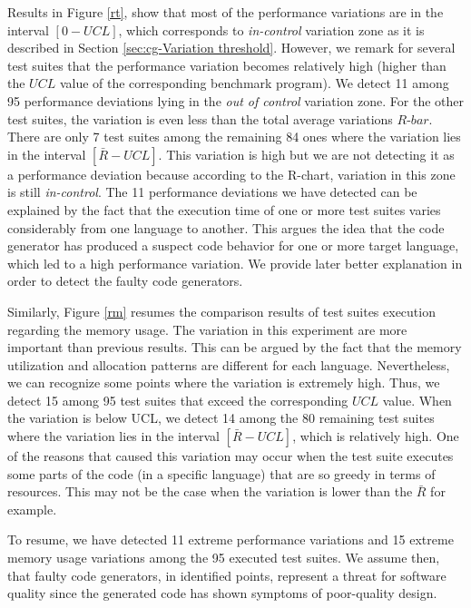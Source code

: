 Results in Figure \ref{rt}, show that most of the performance variations are in the interval $[0-UCL]$, which corresponds to \textit{in-control} variation zone as it is described in Section \ref{sec:cg-Variation threshold}. However, we remark for several test suites that the performance variation becomes relatively high (higher than the $UCL$ value of the corresponding benchmark program). We detect 11 among 95 performance deviations lying in the \textit{out of control} variation zone. For the other test suites, the variation is even less than the total average variations $R$-$bar$. There are only 7 test suites among the remaining 84 ones where the variation lies in the interval $[\bar{R}-UCL]$. This variation is high but we are not detecting it as a performance deviation because according to the R-chart, variation in this zone is still \textit{in-control}. 
The 11 performance deviations we have detected can be explained by the fact that the execution time of one or more test suites varies considerably from one language to another. This argues the idea that the code generator has produced a suspect code behavior for one or more target language, which led to a high performance variation. We provide later better explanation in order to detect the faulty code generators.

Similarly, Figure \ref{rm} resumes the comparison results of test suites execution regarding the memory usage. The variation in this experiment are more important than previous results. This can be argued by the fact that the memory utilization and allocation patterns are different for each language. Nevertheless, we can recognize some points where the variation is extremely high. Thus, we detect 15 among 95 test suites that exceed the corresponding $UCL$ value. 
When the variation is below UCL, we detect 14 among the 80 remaining test suites where the variation lies in the interval $[\bar{R}-UCL]$, which is relatively high. 
One of the reasons that caused this variation may occur when the test suite executes some parts of the code (in a specific language) that are so greedy in terms of resources. This may not be the case when the variation is lower than the $\bar{R}$ for example.


To resume, we have detected 11 extreme performance variations and 15 extreme memory usage variations among the 95 executed test suites. We assume then, that faulty code generators, in identified points, represent a threat for software quality since the generated code has shown symptoms of poor-quality design. 



